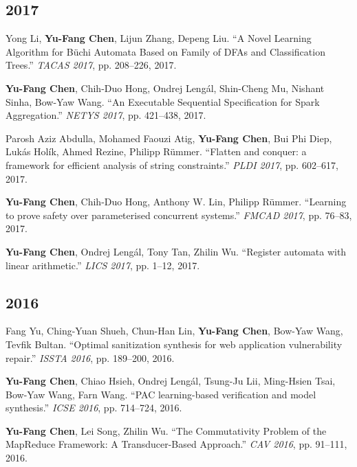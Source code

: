 \documentclass[10.5pt]{article}
\begin{document}
\subsection*{2017}
\begin{enumerate}[leftmargin=*,label={[\arabic*]},resume]
\item Yong Li, \textbf{Yu-Fang Chen}, Lijun Zhang, Depeng Liu. ``A Novel Learning Algorithm for Büchi Automata Based on Family of DFAs and Classification Trees.'' \emph{TACAS 2017}, pp. 208--226, 2017.
\item \textbf{Yu-Fang Chen}, Chih-Duo Hong, Ondrej Lengál, Shin-Cheng Mu, Nishant Sinha, Bow-Yaw Wang. ``An Executable Sequential Specification for Spark Aggregation.'' \emph{NETYS 2017}, pp. 421--438, 2017.
\item Parosh Aziz Abdulla, Mohamed Faouzi Atig, \textbf{Yu-Fang Chen}, Bui Phi Diep, Lukás Holík, Ahmed Rezine, Philipp Rümmer. ``Flatten and conquer: a framework for efficient analysis of string constraints.'' \emph{PLDI 2017}, pp. 602--617, 2017.
\item \textbf{Yu-Fang Chen}, Chih-Duo Hong, Anthony W. Lin, Philipp Rümmer. ``Learning to prove safety over parameterised concurrent systems.'' \emph{FMCAD 2017}, pp. 76--83, 2017.
\item \textbf{Yu-Fang Chen}, Ondrej Lengál, Tony Tan, Zhilin Wu. ``Register automata with linear arithmetic.'' \emph{LICS 2017}, pp. 1--12, 2017.
\end{enumerate}
\subsection*{2016}
\begin{enumerate}[leftmargin=*,label={[\arabic*]},resume]
\item Fang Yu, Ching-Yuan Shueh, Chun-Han Lin, \textbf{Yu-Fang Chen}, Bow-Yaw Wang, Tevfik Bultan. ``Optimal sanitization synthesis for web application vulnerability repair.'' \emph{ISSTA 2016}, pp. 189--200, 2016.
\item \textbf{Yu-Fang Chen}, Chiao Hsieh, Ondrej Lengál, Tsung-Ju Lii, Ming-Hsien Tsai, Bow-Yaw Wang, Farn Wang. ``PAC learning-based verification and model synthesis.'' \emph{ICSE 2016}, pp. 714--724, 2016.
\item \textbf{Yu-Fang Chen}, Lei Song, Zhilin Wu. ``The Commutativity Problem of the MapReduce Framework: A Transducer-Based Approach.'' \emph{CAV 2016}, pp. 91--111, 2016.
\end{enumerate}
\end{document}
